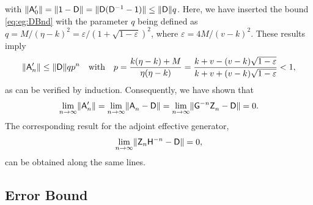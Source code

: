 \documentclass[aps,prl,reprint]{revtex4-2}
\begin{document}
with $\lVert \mathsf{A}'_0 \rVert = \lVert \mathsf{1-\mathsf{D}} \rVert = \lVert \mathsf{D}(\mathsf{D}^{-1}-\mathsf{1}) \rVert\leq \lVert \mathsf{D} \rVert q$.
Here, we have inserted the bound \eqref{eq:eg:DBnd} with the parameter $q$ being defined as $q = M/(\eta-k)^ 2 = \varepsilon/(1+\sqrt{1-\varepsilon})^2$, where $\varepsilon=4M/(v-k)^ 2$.
These results imply
\begin{equation}
\lVert \mathsf{A}'_n \rVert\leq \lVert \mathsf{D} \rVert qp^n
\quad\text{with}\quad
p = \frac{k(\eta-k)+ M}{\eta(\eta-k)}
= \frac{k+v-(v-k)\sqrt{1-\varepsilon}}{k+v+(v-k)\sqrt{1-\varepsilon}} < 1,
\end{equation}
as can be verified by induction.
Consequently, we have shown that
\begin{equation}
\lim_{n\rightarrow\infty}\nrm{\sA'_n}
= \lim_{n\rightarrow\infty}\nrm{\sA_n^{\vphp}-\sD}
= \lim_{n\rightarrow\infty}\nrm{\sG^{-n}\sZ^{\vphp}_n-\sD} = 0.
\end{equation}
The corresponding result for the adjoint effective generator,
\begin{equation}
\lim_{n\rightarrow\infty}\lVert \mathsf{Z}_n\mathsf{H}^{-n} -\mathsf{D} \rVert = 0,
\end{equation}
can be obtained along the same lines.

\subsection{Error Bound}
\end{document}
